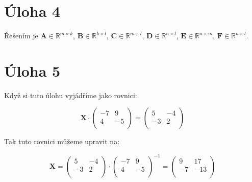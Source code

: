 \documentclass{fkssolpub}
\begin{document}
\section{Úloha 4}

Řešením je $\mathbf{A} \in \mathbb{R}^{m \times k}$, $\mathbf{B} \in \mathbb{R}^{k \times l}$, $\mathbf{C} \in \mathbb{R}^{m \times l}$, $\mathbf{D} \in \mathbb{R}^{n \times l}$, $\mathbf{E} \in \mathbb{R}^{n \times m}$, $\mathbf{F} \in \mathbb{R}^{n \times l}$.

\section{Úloha 5}

Když si tuto úlohu vyjádříme jako rovnici:

\[
	\mathbf{X} \cdot
	\begin{pmatrix}
		-7 & 9  \\
		4  & -5 \\
	\end{pmatrix}
	=
	\begin{pmatrix}
		5  & -4 \\
		-3 & 2  \\
	\end{pmatrix}
\]

Tak tuto rovnici můžeme upravit na:

\[
	\mathbf{X}
	=
	\begin{pmatrix}
		5  & -4 \\
		-3 & 2  \\
	\end{pmatrix} \cdot
	\begin{pmatrix}
		-7 & 9  \\
		4  & -5 \\
	\end{pmatrix}^{-1}
	=
	\begin{pmatrix}
		9  & 17  \\
		-7 & -13 \\
	\end{pmatrix}
\]
\end{document}
